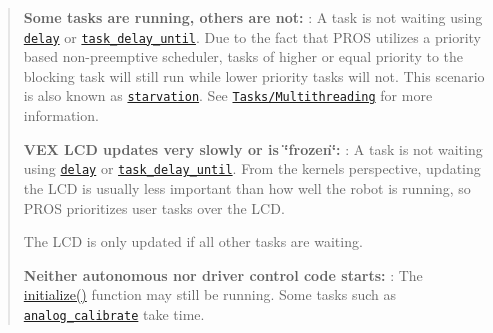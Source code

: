 \begin{quote}

\begin{DoxyItemize}
\item {\bfseries Some tasks are running, others are not\+:} \+: A task is not waiting using \href{../../api/c/rtos.html#delay}{\tt delay} or \href{../../api/c/rtos.html#task-delay-until}{\tt task\+\_\+delay\+\_\+until}. Due to the fact that P\+R\+OS utilizes a priority based non-\/preemptive scheduler, tasks of higher or equal priority to the blocking task will still run while lower priority tasks will not. This scenario is also known as \href{https://en.wikipedia.org/wiki/Starvation_(computer_science)}{\tt starvation}. See \href{/tutorials/topical/multitasking}{\tt Tasks/\+Multithreading} for more information.
\item {\bfseries V\+EX L\+CD updates very slowly or is \char`\"{}frozen\char`\"{}\+:} \+: A task is not waiting using \href{../../api/c/rtos.html#delay}{\tt delay} or \href{../../api/c/rtos.html#task-delay-until}{\tt task\+\_\+delay\+\_\+until}. From the kernel\textquotesingle{}s perspective, updating the L\+CD is usually less important than how well the robot is running, so P\+R\+OS prioritizes user tasks over the L\+CD.

The L\+CD is only updated if all other tasks are waiting.
\item {\bfseries Neither autonomous nor driver control code starts\+:} \+: The {\ttfamily \hyperlink{main_8h_a9efe22aaead3a5e936b5df459de02eba}{initialize()}} function may still be running. Some tasks such as \href{../../api/c/adi.html#analog-calibrate}{\tt analog\+\_\+calibrate} take time.


\end{DoxyItemize}
\end{quote}
